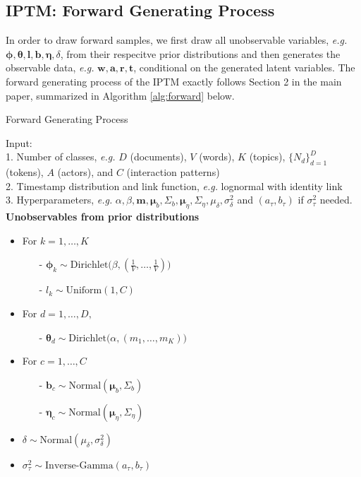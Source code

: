 \documentclass[a4paper]{article}
\begin{document}
  \subsection{IPTM: Forward Generating Process} \label{subsec: Forward Generative Process}
In order to draw forward samples, we first draw all unobservable variables, \textit{e.g.} $\boldsymbol{\phi}, \boldsymbol{\theta}, \boldsymbol{l}, \boldsymbol{b}, \boldsymbol{\eta}, \delta$, from their respecitve prior distributions and then generates the observable data, \textit{e.g.} $\boldsymbol{w}, \boldsymbol{a}, \boldsymbol{r}, \boldsymbol{t}$, conditional on the generated latent variables. The forward generating process of the IPTM exactly follows Section 2 in the main paper, summarized in Algorithm \ref{alg:forward} below.
  	\begin{algorithm}[H]
  		\SetAlgoLined
  		\caption{Forward Generating Process}
  			Input:\\
  			1. Number of classes, \textit{e.g.} $D$ (documents), $V$ (words), $K$ (topics), $\{N_d\}_{d=1}^D$ (tokens), $A$ (actors), and $C$ (interaction patterns)\\
  			2. Timestamp distribution and link function, \textit{e.g.} lognormal with identity link\\ 
 			3. Hyperparameters, \textit{e.g.} $\alpha, \beta, \boldsymbol{m}, \boldsymbol{\mu}_b, \Sigma_b, \boldsymbol{\mu}_\eta, \Sigma_\eta, \mu_\delta, \sigma^2_\delta$ and $(a_\tau, b_\tau)$ if $\sigma_\tau^2$ needed.\\
 			
 			\textbf{Unobservables from prior distributions}
	  		\begin{itemize}
	  			\item For $k=1,\ldots, K$
	  			\begin{itemize}
	  			\item[-] $\boldsymbol{\phi}_k \sim \mbox{Dirichlet}\Big(\beta, (\frac{1}{V},\ldots,\frac{1}{V})\Big)$
	  			\item[-] $l_k\sim \mbox{Uniform}(1, C)$
	  			\end{itemize}
	  			\item For $d=1,\ldots, D,$
	  			\begin{itemize}
	  			\item[-] $\boldsymbol{\theta}_d \sim \mbox{Dirichlet}\Big(\alpha, (m_1,\ldots,m_K)\Big)$
	  			\end{itemize}
	  			\item For $c=1,\ldots, C$
	  			\begin{itemize}
	  				\item[-] $\boldsymbol{b}_c \sim \mbox{Normal}(\boldsymbol{\mu}_b,  \Sigma_b)$
	  				\item[-] $\boldsymbol{\eta}_c \sim \mbox{Normal}(\boldsymbol{\mu}_\eta,  \Sigma_\eta)$
	  			\end{itemize}
	  			\item $\delta \sim \mbox{Normal}(\mu_\delta, \sigma^2_\delta)$ 
	  			\item $\sigma_\tau^2 \sim \mbox{Inverse-Gamma}(a_\tau, b_\tau)$\\
	  		\end{itemize}
	  		

\end{algorithm}
\end{document}

